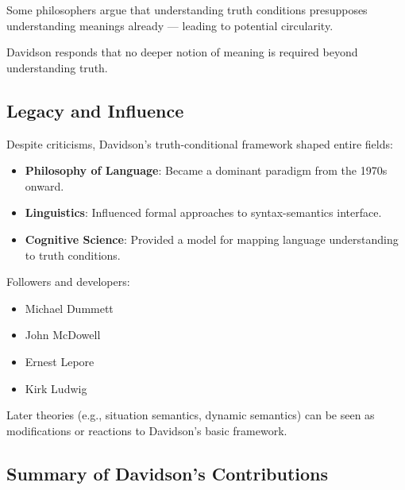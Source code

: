 \documentclass[12pt]{article}
\newcommand{\tightlist}{\itemsep 0pt\parskip 0pt\parsep 0pt}
\begin{document}
Some philosophers argue that understanding truth conditions presupposes
understanding meanings already --- leading to potential circularity.

Davidson responds that no deeper notion of meaning is required beyond
understanding truth.

\hypertarget{legacy-and-influence-1}{%
\subsection{Legacy and Influence}\label{legacy-and-influence-1}}

Despite criticisms, Davidson's truth-conditional framework shaped entire
fields:

\begin{itemize}
\tightlist
\item
  \textbf{Philosophy of Language}: Became a dominant paradigm from the
  1970s onward.
\item
  \textbf{Linguistics}: Influenced formal approaches to syntax-semantics
  interface.
\item
  \textbf{Cognitive Science}: Provided a model for mapping language
  understanding to truth conditions.
\end{itemize}

Followers and developers:

\begin{itemize}
\tightlist
\item
  Michael Dummett
\item
  John McDowell
\item
  Ernest Lepore
\item
  Kirk Ludwig
\end{itemize}

Later theories (e.g., situation semantics, dynamic semantics) can be
seen as modifications or reactions to Davidson's basic framework.

\hypertarget{summary-of-davidsons-contributions}{%
\subsection{Summary of Davidson's
Contributions}\label{summary-of-davidsons-contributions}}
\end{document}
